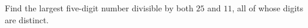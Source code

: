 Find the largest five-digit number divisible by both $25$ and $11$, all of whose digits are distinct.
